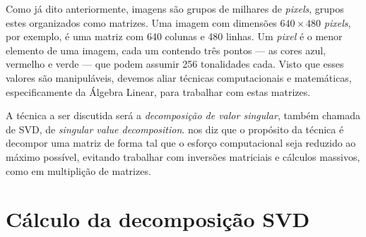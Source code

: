 \documentclass[a4paper,12pt]{article}
\renewcommand{\sin}{\operatorname{sen}}
\begin{document}
Como já dito anteriormente, imagens são grupos de milhares de \textit{pixels}, grupos estes organizados como matrizes. Uma imagem com dimensões $640\times480$ \textit{pixels}, por exemplo, é uma matriz com 640 colunas e 480 linhas. Um \textit{pixel} é o menor elemento de uma imagem, cada um contendo três pontos --- as cores azul, vermelho e verde --- que podem assumir 256 tonalidades cada. Visto que esses valores são manipuláveis, devemos aliar técnicas computacionais e matemáticas, especificamente da Álgebra Linear, para trabalhar com estas matrizes.

A técnica a ser discutida será a \emph{decomposição de valor singular}, também chamada de SVD, de \textit{singular value decomposition}.\cite{dearaujo2014} nos diz que o propósito da técnica é decompor uma matriz de forma tal que o esforço computacional seja reduzido ao máximo possível, evitando trabalhar com inversões matriciais e cálculos massivos, como em multiplição de matrizes.

\section{Cálculo da decomposição SVD}
\label{sec:fundamentacao}





 
\end{document}
